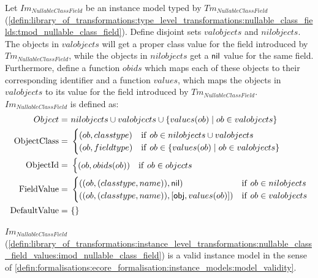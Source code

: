\begin{defin}
\label{defin:library_of_transformations:instance_level_transformations:nullable_class_field_values:imod_nullable_class_field}
Let $Im_{NullableClassField}$ be an instance model typed by $Tm_{NullableClassField}$ (\cref{defin:library_of_transformations:type_level_transformations:nullable_class_fields:tmod_nullable_class_field}). Define disjoint sets $valobjects$ and $nilobjects$. The objects in $valobjects$ will get a proper class value for the field introduced by $Tm_{NullableClassField}$, while the objects in $nilobjects$ get a $\mathsf{nil}$ value for the same field. Furthermore, define a function $obids$ which maps each of these objects to their corresponding identifier and a function $values$, which maps the objects in $valobjects$ to its value for the field introduced by $Tm_{NullableClassField}$. $Im_{NullableClassField}$ is defined as:
\begin{align*}
Object =\ &nilobjects \cup valobjects \cup \{ values(ob) \mid ob \in valobjects \} \\
\mathrm{ObjectClass} =\ & \begin{cases}
    (ob, classtype) & \mathrm{if }\ ob \in nilobjects \cup valobjects\\
    (ob, fieldtype) & \mathrm{if }\ ob \in \{ values(ob) \mid ob \in valobjects \}
\end{cases}\\
\mathrm{ObjectId} =\ & \begin{cases}
    (ob, obids(ob)) & \mathrm{if }\ ob \in objects
\end{cases}\\
\mathrm{FieldValue} =\ & \begin{cases}
    ((ob, (classtype, name)), \mathsf{nil}) & \mathrm{if }\ ob \in nilobjects\\
    ((ob, (classtype, name)), [\mathsf{obj}, values(ob)]) & \mathrm{if }\ ob \in valobjects
\end{cases} \\
\mathrm{DefaultValue} =\ & \{\}
\end{align*}
\end{defin}

\begin{thm}
\label{defin:library_of_transformations:instance_level_transformations:nullable_class_field_values:imod_nullable_class_field_correct}
$Im_{NullableClassField}$ (\cref{defin:library_of_transformations:instance_level_transformations:nullable_class_field_values:imod_nullable_class_field}) is a valid instance model in the sense of \cref{defin:formalisations:ecore_formalisation:instance_models:model_validity}.
\end{thm}

